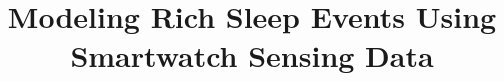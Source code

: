 \documentclass[acmlarge]{acmart}
\begin{document}
\title{Modeling Rich Sleep Events Using Smartwatch Sensing Data}



\maketitle








\begin{small}


\end{small}
\end{document}
